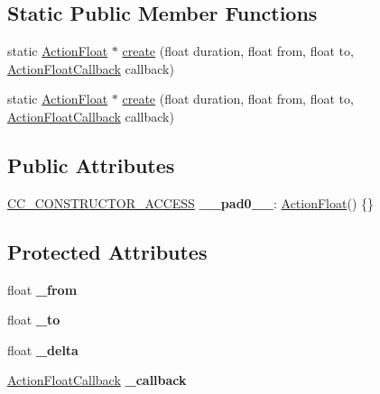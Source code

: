 \subsection*{Static Public Member Functions}
\begin{DoxyCompactItemize}
\item 
static \hyperlink{classActionFloat}{Action\+Float} $\ast$ \hyperlink{classActionFloat_abadc4e7961437c430ce61d9c69d3b720}{create} (float duration, float from, float to, \hyperlink{classActionFloat_a47a1fbc750167a8f9d754c62a62eaafa}{Action\+Float\+Callback} callback)
\item 
static \hyperlink{classActionFloat}{Action\+Float} $\ast$ \hyperlink{classActionFloat_a61bf23d719c1ff01d475c1e8d1f9ec6a}{create} (float duration, float from, float to, \hyperlink{classActionFloat_a47a1fbc750167a8f9d754c62a62eaafa}{Action\+Float\+Callback} callback)
\end{DoxyCompactItemize}
\subsection*{Public Attributes}
\begin{DoxyCompactItemize}
\item 
\mbox{\label{classActionFloat_a69a1eb7f0a71f6d48f6a6d0aa9f3bacd}} 
\hyperlink{_2cocos2d_2cocos_2base_2ccConfig_8h_a25ef1314f97c35a2ed3d029b0ead6da0}{C\+C\+\_\+\+C\+O\+N\+S\+T\+R\+U\+C\+T\+O\+R\+\_\+\+A\+C\+C\+E\+SS} {\bfseries \+\_\+\+\_\+pad0\+\_\+\+\_\+}\+: \hyperlink{classActionFloat}{Action\+Float}() \{\}
\end{DoxyCompactItemize}
\subsection*{Protected Attributes}
\begin{DoxyCompactItemize}
\item 
\mbox{\label{classActionFloat_a74dc11ef5d83e17bacb7f66e83c4bc67}} 
float {\bfseries \+\_\+from}
\item 
\mbox{\label{classActionFloat_aa51bb6165abec281793023f1f65c2560}} 
float {\bfseries \+\_\+to}
\item 
\mbox{\label{classActionFloat_a75bde7a49ce7fed2b84aba76978eb85c}} 
float {\bfseries \+\_\+delta}
\item 
\mbox{\label{classActionFloat_a439c7a524de5004f88a9d57c0df15274}} 
\hyperlink{classActionFloat_a47a1fbc750167a8f9d754c62a62eaafa}{Action\+Float\+Callback} {\bfseries \+\_\+callback}
\end{DoxyCompactItemize}
